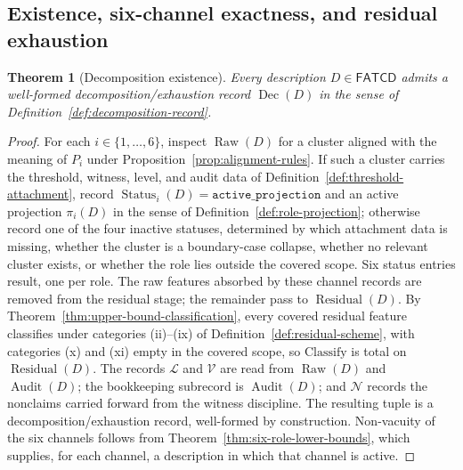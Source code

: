 \documentclass[11pt]{article}
\newtheorem{theorem}{Theorem}[section]
\theoremstyle{definition}
\newcommand{\FATCD}{\ensuremath{\mathsf{FATCD}}}
\newcommand{\Raw}[1]{\ensuremath{\operatorname{Raw}\!\left(#1\right)}}
\newcommand{\Audit}[1]{\ensuremath{\operatorname{Audit}\!\left(#1\right)}}
\newcommand{\Dec}[1]{\ensuremath{\operatorname{Dec}\!\left(#1\right)}}
\newcommand{\Residual}[1]{\ensuremath{\operatorname{Residual}\!\left(#1\right)}}
\newcommand{\Status}[2]{\ensuremath{\operatorname{Status}_{#1}\!\left(#2\right)}}
\newcommand{\activeproj}{\texttt{active\_projection}}
\begin{document}
\subsection{Existence, six-channel exactness, and residual exhaustion}\label{subsec:dec-theorems}

\begin{theorem}[Decomposition existence]\label{thm:decomposition-existence}
Every description \(D \in \FATCD{}\) admits a well-formed decomposition/exhaustion
record \(\Dec{D}\) in the sense of
Definition~\ref{def:decomposition-record}.
\end{theorem}

\begin{proof}
For each \(i \in \{1,\ldots,6\}\), inspect \(\Raw{D}\) for a cluster
aligned with the meaning of \(P_i\) under
Proposition~\ref{prop:alignment-rules}. If such a cluster carries the
threshold, witness, level, and audit data of
Definition~\ref{def:threshold-attachment}, record
\(\Status{i}{D} = \activeproj\) and an active projection
\(\pi_i(D)\) in the sense of Definition~\ref{def:role-projection};
otherwise record one of the four inactive statuses, determined by
which attachment data is missing, whether the cluster is a
boundary-case collapse, whether no relevant cluster exists, or
whether the role lies outside the covered scope. Six status entries
result, one per role. The raw features absorbed by these channel
records are removed from the residual stage; the remainder pass to
\(\Residual{D}\). By Theorem~\ref{thm:upper-bound-classification},
every covered residual feature classifies under categories (ii)--(ix)
of Definition~\ref{def:residual-scheme}, with categories (x) and (xi)
empty in the covered scope, so \(\mathrm{Classify}\) is total on
\(\Residual{D}\). The records \(\mathcal{L}\) and \(\mathcal{V}\) are
read from \(\Raw{D}\) and \(\Audit{D}\); the bookkeeping subrecord is
\(\Audit{D}\); and \(\mathcal{N}\) records the nonclaims carried
forward from the witness discipline. The resulting tuple is a
decomposition/exhaustion record, well-formed by construction.
Non-vacuity of the six channels follows from
Theorem~\ref{thm:six-role-lower-bounds}, which supplies, for each
channel, a description in which that channel is active.
\end{proof}
\end{document}
